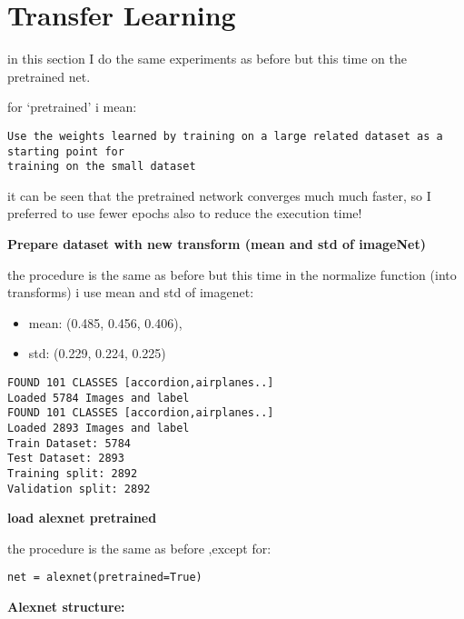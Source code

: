 \documentclass[11pt]{article}
\providecommand{\tightlist}{%
      \setlength{\itemsep}{0pt}\setlength{\parskip}{0pt}}
\begin{document}
    \hypertarget{transfer-learning}{%
\section{Transfer Learning}\label{transfer-learning}}

in this section I do the same experiments as before but this time on the
pretrained net.

for `pretrained' i mean:

\begin{verbatim}
Use the weights learned by training on a large related dataset as a starting point for
training on the small dataset 
\end{verbatim}

it can be seen that the pretrained network converges much much faster,
so I preferred to use fewer epochs also to reduce the execution time!

    \textbf{Prepare dataset with new transform (mean and std of imageNet)}

the procedure is the same as before but this time in the normalize
function (into transforms) i use mean and std of imagenet:

\begin{itemize}
\tightlist
\item
  mean: (0.485, 0.456, 0.406),
\item
  std: (0.229, 0.224, 0.225)
\end{itemize}

    \begin{Verbatim}[commandchars=\\\{\}]
FOUND 101 CLASSES [accordion,airplanes..]
Loaded 5784 Images and label
FOUND 101 CLASSES [accordion,airplanes..]
Loaded 2893 Images and label
Train Dataset: 5784
Test Dataset: 2893
Training split: 2892
Validation split: 2892
\end{Verbatim}

    \textbf{load alexnet pretrained}

the procedure is the same as before ,except for:

\begin{verbatim}
net = alexnet(pretrained=True)
\end{verbatim}

    \textbf{Alexnet structure:}
\end{document}
